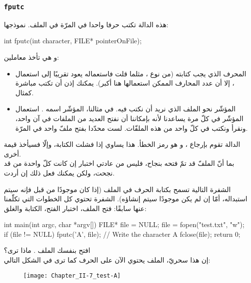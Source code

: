 \subsubsection{\texttt{fputc}}

هذه الدالة تكتب حرفا واحدا في المرّة في الملف. نموذجها:

\begin{Csource}
int fputc(int character, FILE* pointerOnFile);
\end{Csource}

و هي تأخذ معاملين:

\begin{itemize}
  \item المحرف الذي يجب كتابته (من نوع
،
مثلما قلت فاستعماله يعود تقريبًا إلى استعمال
،
إلا أن عدد المحارف الممكن استعمالها هنا أكبر). يمكنك إذن أن تكتب مباشرة
كمثال.
  \item المؤشّر نحو الملف الذي نريد أن نكتب فيه. في مثالنا، المؤشّر اسمه
.
استعمال المؤشّر في كلّ مرة يساعدنا لأنه بإمكاننا أن نفتح العديد من الملفات في آن واحد، ونقرأ ونكتب في كلّ واحد من هذه الملفّات. لست محدّدا بفتح ملفّ واحد في المرّة.
\end{itemize}

الدالة تقوم بإرجاع
،
و هو رمز الخطأ. هذا 
يساوي
إذا فشلت الكتابة، وإلّا فسيأخذ قيمة أخرى.\\
بما أنّ الملفّ قد تمّ فتحه بنجاح، فليس من عادتي اختبار إن كانت كلّ واحدة من
قد نجحت، ولكن يمكنك فعل ذلك إن أردت.

الشفرة التالية تسمح بكتابة الحرف
في الملف
(إذا كان موجودًا من قبل فإنه سيتم استبداله، أمّا إن لم يكن موجودًا سيتم إنشاؤه). الشفرة تحتوي كل الخطوات التي تكلّمنا عنها سابقًا: فتح الملف، اختبار الفتح، الكتابة والغلق:

\begin{Csource}
int main(int argc, char *argv[])
{
    FILE* file = NULL;
    file = fopen("test.txt", "w");
    if (file != NULL)
    {
        fputc('A', file); // Write the character A
        fclose(file);
    }
    return 0;
}
\end{Csource}

افتح بنفسك الملف
.
ماذا ترى؟\\
إن هذا سحريّ، الملف يحتوي الآن على الحرف
كما ترى في الشكل التالي:

\begin{figure}[H]
	\centering
	\texttt{[image: Chapter\_II-7\_test-A]}
\end{figure}

